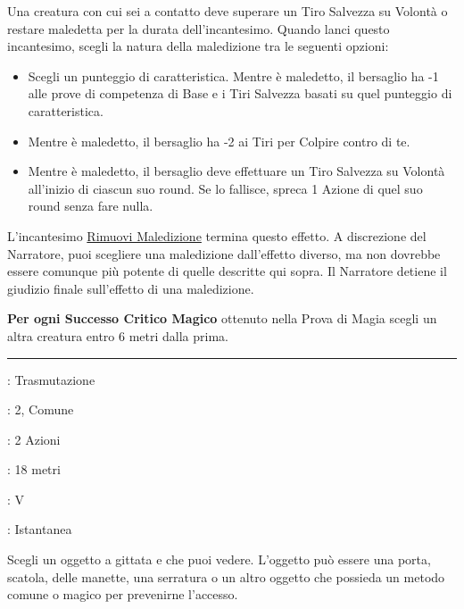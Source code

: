 \begin{multicols}{2}
Una creatura con cui sei a contatto deve superare un Tiro Salvezza su Volontà o restare maledetta per la durata dell'incantesimo. Quando lanci questo incantesimo, scegli la natura della maledizione tra le seguenti opzioni:

\begin{itemize}[leftmargin=*] \setlength{\itemsep}{0pt}
	\item Scegli un punteggio di caratteristica. Mentre è maledetto, il bersaglio ha -1 alle prove di competenza di Base e i Tiri Salvezza basati su quel punteggio di caratteristica.
	\item Mentre è maledetto, il bersaglio ha -2 ai Tiri per Colpire contro di te.
	\item Mentre è maledetto, il bersaglio deve effettuare un Tiro Salvezza su Volontà all'inizio di ciascun suo round. Se lo fallisce, spreca 1 Azione di quel suo round senza fare nulla.
\end{itemize}

L'incantesimo \hyperlink{Rimuovi Maledizione}{Rimuovi Maledizione} termina questo effetto. A discrezione del Narratore, puoi scegliere una maledizione dall'effetto diverso, ma non dovrebbe essere comunque più potente di quelle descritte qui sopra. Il Narratore detiene il giudizio finale sull'effetto di una maledizione.

\textbf{Per ogni Successo Critico Magico} ottenuto nella Prova di Magia scegli un altra creatura entro 6 metri dalla prima.

\smallskip\noindent\rule{\linewidth}{2pt} \hypertarget{Scassinare}{}\smallskip{}\label{knock}
\noindent
\begin{description}[noitemsep, topsep=0pt, parsep=0pt, partopsep=0pt, leftmargin=0cm, labelwidth=2.8cm]
	\item[\textbf{Lista di Magia}]: Trasmutazione
	\item[\textbf{Livello}]: 2, Comune
	\item[\textbf{T. di Lancio}]: 2 Azioni
	\item[\textbf{Gittata}]: 18 metri
	\item[\textbf{Componenti}]: V
	\item[\textbf{Durata}]: Istantanea
\end{description}

Scegli un oggetto a gittata e che puoi vedere. L'oggetto può essere una porta, scatola, delle manette, una serratura o un altro oggetto che possieda un metodo comune o magico per prevenirne l'accesso.


\end{multicols}
